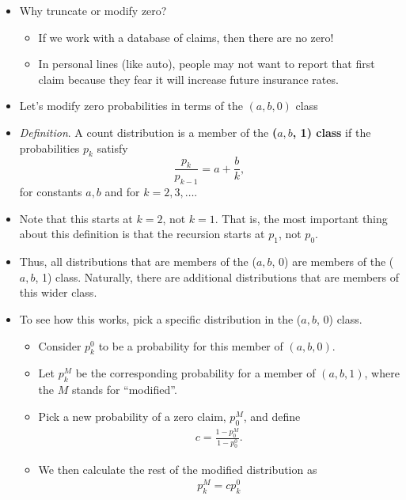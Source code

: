 \documentclass[]{book}
\theoremstyle{definition}
\theoremstyle{definition}
\theoremstyle{definition}
\theoremstyle{remark}
\begin{document}
\begin{itemize}
\item
  Why truncate or modify zero?

  \begin{itemize}
  \item
    If we work with a database of claims, then there are no zero!
  \item
    In personal lines (like auto), people may not want to report that
    first claim because they fear it will increase future insurance
    rates.
  \end{itemize}
\item
  Let's modify zero probabilities in terms of the \((a,b,0)\) class
\item
  \emph{Definition}. A count distribution is a member of the
  \textbf{(\(a, b\), 1) class} if the probabilities \(p_k\) satisfy
  \[\frac{p_k}{p_{k-1}}=a+\frac{b}{k},\] for constants \(a,b\) and for
  \(k=2,3, \ldots\).
\item
  Note that this starts at \(k=2\), not \(k=1\). That is, the most
  important thing about this definition is that the recursion starts at
  \(p_1\), not \(p_0\).
\item
  Thus, all distributions that are members of the (\(a, b\), 0) are
  members of the (\(a, b\), 1) class. Naturally, there are additional
  distributions that are members of this wider class.
\item
  To see how this works, pick a specific distribution in the (\(a, b\),
  0) class.

  \begin{itemize}
  \item
    Consider \(p_k^0\) to be a probability for this member of
    \((a,b,0)\).
  \item
    Let \(p_k^M\) be the corresponding probability for a member of
    \((a,b,1)\), where the \(M\) stands for ``modified''.
  \item
    Pick a new probability of a zero claim, \(p_0^M\), and define
    \[\begin{aligned}
    c = \frac{1-p_0^M}{1-p_0^0} .\end{aligned}\]
  \item
    We then calculate the rest of the modified distribution as
    \[\begin{aligned}
    p_k^M =c p_k^0\end{aligned}\]
  \end{itemize}
\end{itemize}
\end{document}
